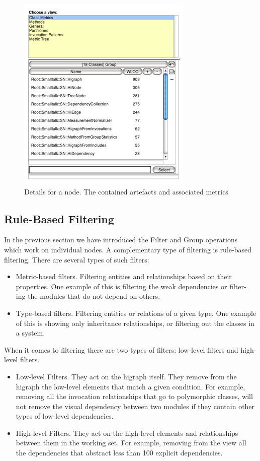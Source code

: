 \documentclass[preprint,12pt]{elsarticle}
\begin{document}
\begin{figure}[h]
\begin{center}
\includegraphics[width=0.5\linewidth]{images/DetailForNode.png}
\caption{Details for a node. The contained artefacts and associated metrics}
\end{center}
\end{figure}


\newpage
\subsection {Rule-Based Filtering}

In the previous section we have introduced the Filter and Group operations which work on individual nodes. A complementary type of filtering is rule-based filtering. There are several types of such filters:

\begin{itemize}
\item Metric-based filters. Filtering entities and relationships based on their properties. One example of this is filtering the weak dependencies or filter- ing the modules that do not depend on others.
\item Type-based filters. Filtering entities or relations of a given type. One example of this is showing only inheritance relationships, or filtering out the classes in a system.
\end{itemize}



When it comes to filtering there are two types of filters: low-level filters and high-level filters.

\begin{itemize}

\item Low-level Filters. They act on the higraph itself. They remove from the higraph the low-level elements that match a given condition. For example, removing all the invocation relationships that go to polymorphic classes, will not remove the visual dependency between two modules if they contain other types of low-level dependencies.

\item High-level Filters. They act on the high-level elements and relationships between them in the working set. For example, removing from the view all the dependencies that abstract less than 100 explicit dependencies.

\end{itemize}
\end{document}
